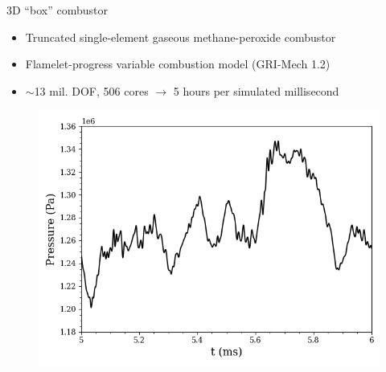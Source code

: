 \documentclass[]{beamer}
\begin{document}
\begin{frame}{3D ``box'' combustor\footnotemark[14]}
	\begin{itemize}
		\item Truncated single-element gaseous methane-peroxide combustor
		\item Flamelet-progress variable combustion model (GRI-Mech 1.2)
		\item $\sim$13 mil. DOF, 506 cores $\rightarrow$ 5 hours per simulated millisecond
	\end{itemize}
	\begin{minipage}{0.49\linewidth}
		\begin{figure}
		\end{figure}
	\end{minipage}
	\begin{minipage}{0.49\linewidth}
		\begin{figure}
			\includegraphics[width=0.95\linewidth]{experiments/box/point_1_Static_Pressure_FOM.png}
		\end{figure}
	\end{minipage}
\end{frame}
\end{document}
